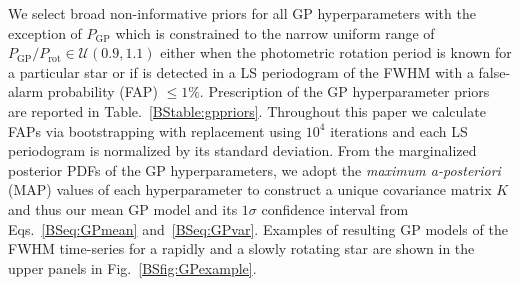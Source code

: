 We select broad non-informative priors for all GP hyperparameters with the
exception of $P_{\text{GP}}$ which is constrained to the narrow uniform range of
$P_{\text{GP}}/P_{\text{rot}} \in \mathcal{U}(0.9,1.1)$ either when the photometric rotation period is known for a
particular star or if \prot{} is detected in a LS periodogram
of the FWHM with a false-alarm probability (FAP) $\le 1$\%. Prescription of the GP hyperparameter priors are
reported in Table.~\ref{BStable:gppriors}. Throughout this paper we calculate FAPs via
bootstrapping with replacement using $10^4$ iterations and each LS periodogram is normalized by its standard
deviation. From the marginalized posterior PDFs of the GP hyperparameters, we adopt the \emph{maximum a-posteriori}
(MAP) values of each hyperparameter to construct a unique covariance matrix $K$ and thus our mean GP model
and its $1\sigma$ confidence interval from Eqs.~\ref{BSeq:GPmean} and~\ref{BSeq:GPvar}. Examples of resulting
GP models of the FWHM time-series for a rapidly and a slowly rotating star are shown in the upper panels in
Fig.~\ref{BSfig:GPexample}.





